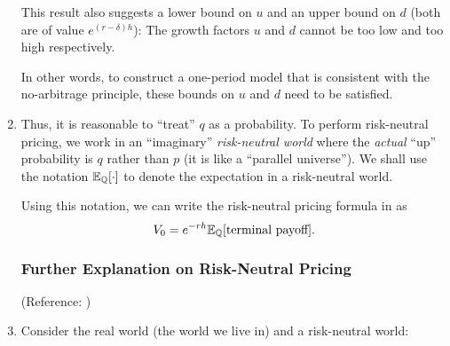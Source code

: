 \begin{enumerate}
\begin{note}
This result also suggests a lower bound on \(u\) and an upper bound on \(d\)
(both are of value \(e^{(r-\delta)h}\)): The growth factors \(u\) and \(d\)
cannot be too low and too high respectively.

In other words, to construct a one-period model that is consistent with the
no-arbitrage principle, these bounds on \(u\) and \(d\) need to be satisfied.
 \end{note}
\item \label{it:rn-pricing-fmla}
Thus, it is reasonable to ``treat'' \(q\) as a probability. To perform
risk-neutral pricing, we work in an ``imaginary'' \emph{risk-neutral world}
where the \emph{actual} ``up'' probability is \(q\) rather than \(p\) (it is
like a ``parallel universe''). We shall use the notation \(\mathbb{E}_{\mathbb{Q}}\qty[\cdot]\) to
denote the expectation in a risk-neutral world.

Using this notation, we can write the risk-neutral pricing formula in
 as
\[
V_0=e^{-rh}\mathbb{E}_{\mathbb{Q}}\qty[\text{terminal payoff}].
\]
\subsubsection*{Further Explanation on Risk-Neutral Pricing}
(Reference: \textcite[Section~4.1.2]{lo2018derivative})

\item Consider the real world (the world we live in) and a risk-neutral
world:

\begin{center}

\end{center}


\end{enumerate}
